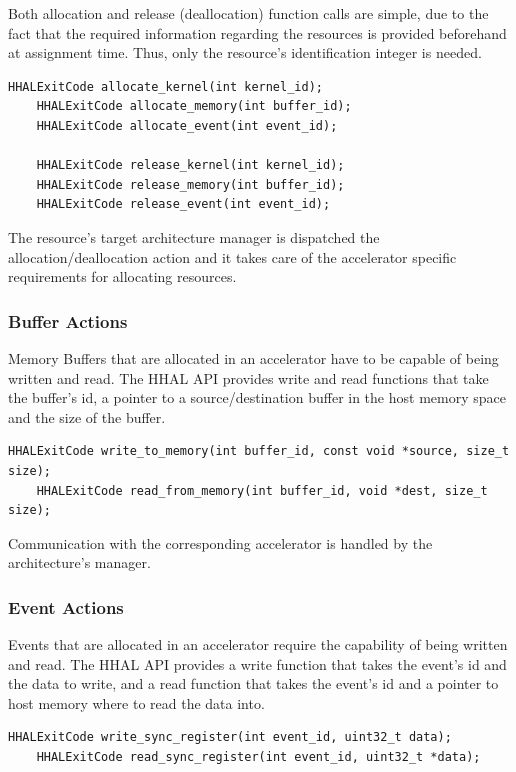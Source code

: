 Both allocation and release (deallocation) function calls are simple, due to the fact that the required information regarding the resources is provided beforehand at assignment time. Thus, only the resource's identification integer is needed.

\begin{lstlisting}[style=CStyle, caption=HHAL API - Allocation functions]
    HHALExitCode allocate_kernel(int kernel_id);
    HHALExitCode allocate_memory(int buffer_id);
    HHALExitCode allocate_event(int event_id);

    HHALExitCode release_kernel(int kernel_id);
    HHALExitCode release_memory(int buffer_id);
    HHALExitCode release_event(int event_id);
\end{lstlisting}

The resource's target architecture manager is dispatched the allocation/deallocation action and it takes care of the accelerator specific requirements for allocating resources.

\subsubsection{Buffer Actions}

Memory Buffers that are allocated in an accelerator have to be capable of being written and read. The HHAL API provides write and read functions that take the buffer's id, a pointer to a source/destination buffer in the host memory space and the size of the buffer.

\begin{lstlisting}[style=CStyle, caption=HHAL API - Buffer actions]
    HHALExitCode write_to_memory(int buffer_id, const void *source, size_t size);
    HHALExitCode read_from_memory(int buffer_id, void *dest, size_t size);
\end{lstlisting}

Communication with the corresponding accelerator is handled by the architecture's manager.

\subsubsection{Event Actions}
Events that are allocated in an accelerator require the capability of being written and read. The HHAL API provides a write function that takes the event's id and the data to write, and a read function that takes the event's id and a pointer to host memory where to read the data into.

\begin{lstlisting}[style=CStyle, caption=HHAL API - Event actions]
    HHALExitCode write_sync_register(int event_id, uint32_t data);
    HHALExitCode read_sync_register(int event_id, uint32_t *data);
\end{lstlisting}

